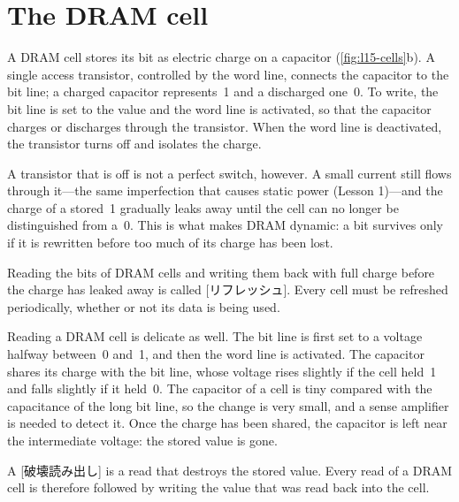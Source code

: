\documentclass[../main.tex]{subfiles}
\begin{document}
\section{The DRAM cell}
\label{sec:l15-dram}

A DRAM cell stores its bit as electric charge on a capacitor
(\cref{fig:l15-cells}b).  A single access transistor, controlled by the word line,
connects the capacitor to the bit line; a charged capacitor represents~1 and a
discharged one~0.  To write, the bit line is set to the value and the word
line is activated, so that the capacitor charges or discharges through the
transistor.  When the word line is deactivated, the transistor turns off and
isolates the charge.

A transistor that is off is not a perfect switch, however.  A small current
still flows through it---the same imperfection that causes static power
(Lesson 1)---and the charge of a stored~1 gradually leaks away until the cell
can no longer be distinguished from a~0.  This is what makes DRAM dynamic: a
bit survives only if it is rewritten before too much of its charge has been
lost.

\begin{definition}[Refresh]
  Reading the bits of DRAM cells and writing them back with full charge
  before the charge has leaked away is called [リフレッシュ].
  Every cell must be refreshed periodically, whether or not its data is being
  used.
\end{definition}

Reading a DRAM cell is delicate as well.  The bit line is first set to a
voltage halfway between~0 and~1, and then the word line is activated.  The
capacitor shares its charge with the bit line, whose voltage rises slightly if
the cell held~1 and falls slightly if it held~0.  The capacitor of a cell is
tiny compared with the capacitance of the long bit line, so the change is very
small, and a sense amplifier is needed to detect it.  Once the charge has been
shared, the capacitor is left near the intermediate voltage: the stored value
is gone.

\begin{definition}
  A [破壊読み出し] is a read that destroys the stored
  value.  Every read of a DRAM cell is therefore followed by writing the value
  that was read back into the cell.
\end{definition}
\end{document}
